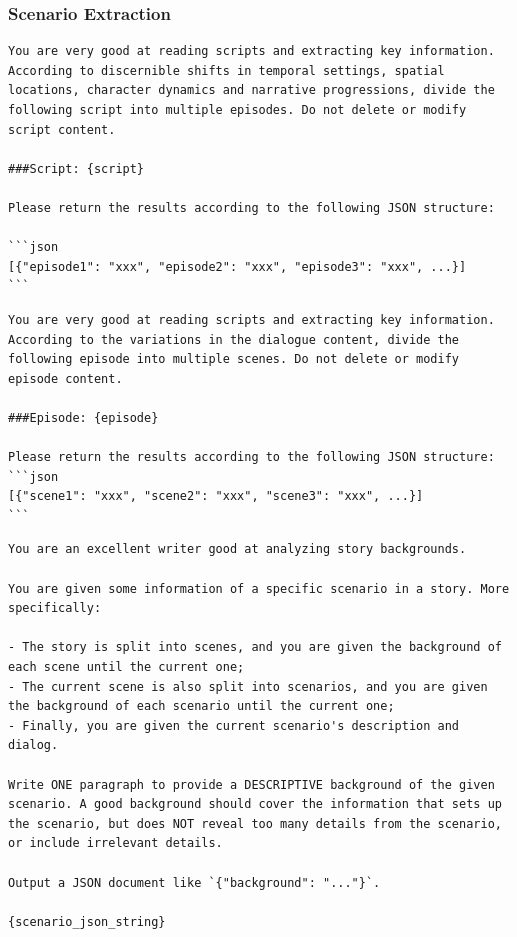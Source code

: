 \subsubsection{Scenario Extraction}\label{app:data_source}

\begin{tcolorbox}[width=\linewidth]
\begin{lstlisting}[caption=Episodes Division]
You are very good at reading scripts and extracting key information. According to discernible shifts in temporal settings, spatial locations, character dynamics and narrative progressions, divide the following script into multiple episodes. Do not delete or modify script content.

###Script: {script}

Please return the results according to the following JSON structure:

```json
[{"episode1": "xxx", "episode2": "xxx", "episode3": "xxx", ...}]
```
\end{lstlisting}
\end{tcolorbox}

\begin{tcolorbox}[width=\linewidth]
\begin{lstlisting}[caption=Scenes Division]
You are very good at reading scripts and extracting key information. According to the variations in the dialogue content, divide the following episode into multiple scenes. Do not delete or modify episode content.

###Episode: {episode}

Please return the results according to the following JSON structure:
```json
[{"scene1": "xxx", "scene2": "xxx", "scene3": "xxx", ...}]
```
\end{lstlisting}
\end{tcolorbox}

\begin{tcolorbox}[width=\linewidth]
\begin{lstlisting}[caption=Descriptive Background Generation]
You are an excellent writer good at analyzing story backgrounds.

You are given some information of a specific scenario in a story. More specifically:

- The story is split into scenes, and you are given the background of each scene until the current one;
- The current scene is also split into scenarios, and you are given the background of each scenario until the current one;
- Finally, you are given the current scenario's description and dialog.

Write ONE paragraph to provide a DESCRIPTIVE background of the given scenario. A good background should cover the information that sets up the scenario, but does NOT reveal too many details from the scenario, or include irrelevant details.

Output a JSON document like `{"background": "..."}`.

{scenario_json_string}
\end{lstlisting}
\end{tcolorbox}

